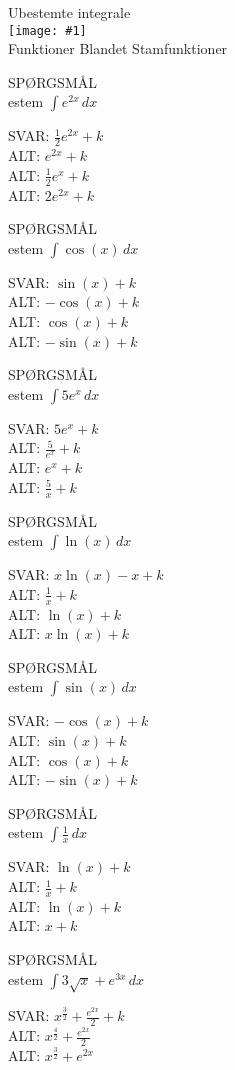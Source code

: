 \documentclass[]{article}
\newcounter{spgcounter}
\newenvironment{question}[2]{\addtocounter{spgcounter}{1} SPØRGSMÅL \thespgcounter\\}{\hspace{50px}}
\newcommand{\name}[1]{{\huge #1}\\}
\newcommand{\tag}[1]{#1}
\newcommand{\cover}[1]{\texttt{[image: \#1]}\\}
\newcommand{\answer}[1]{{\color{green} SVAR: #1}\\}
\newcommand{\alt}[1]{{\color{red} ALT: #1}\\}
\begin{document}
\name{Ubestemte integrale}
\cover{sinintegral.png}
\tag{Funktioner}
\tag{Blandet}
\tag{Stamfunktioner}

\begin{question}{multi}

Bestem $\int{e^{2x}}\, dx$

\answer{$\frac{1}{2}e^{2x} + k$}
\alt{$e^{2x} + k$}
\alt{$\frac{1}{2}e^{x} + k$}
\alt{$2e^{2x} + k$}

\end{question}

\begin{question}{multi}

Bestem $\int{\cos(x)}\, dx$

\answer{$\sin(x) + k$}
\alt{$-\cos(x) + k$}
\alt{$\cos(x) + k$}
\alt{$-\sin(x) + k$}

\end{question}

\begin{question}{multi}

Bestem $\int{5e^x}\, dx$

\answer{$5e^x + k$}
\alt{$\frac{5}{e^x} + k$}
\alt{$e^x + k$}
\alt{$\frac{5}{x} + k$}

\end{question}

\begin{question}{multi}

Bestem $\int{\ln(x)}\, dx$

\answer{$x\ln(x) - x + k$}
\alt{$\frac{1}{x} + k$}
\alt{$\ln(x) + k$}
\alt{$x\ln(x) + k$}

\end{question}

\begin{question}{multi}

Bestem $\int{\sin(x)}\, dx$

\answer{$-\cos(x) + k$}
\alt{$\sin(x) + k$}
\alt{$\cos(x) + k$}
\alt{$-\sin(x) + k$}

\end{question}

\begin{question}{multi}

Bestem $\int \frac{1}{x}\, dx $

\answer{$\ln(x) + k$}
\alt{$\frac{1}{x} + k$}
\alt{$\ln(x) + k$}
\alt{$x + k$}

\end{question}

\begin{question}{multi}

Bestem $\int 3 \sqrt{x} + e^{3 x}\, dx$
    
\answer{$x^{\frac{3}{2}} + \frac{e^{2x}}{2} + k$}
\alt{$x^{\frac{4}{2}} + \frac{e^{2x}}{2}$}
\alt{$x^{\frac{3}{2}} + e^{2x}$}

\end{question}
\end{document}
